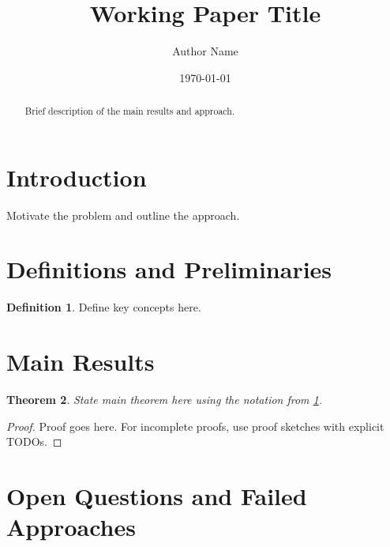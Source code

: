 \documentclass{article}
\title{Working Paper Title}
\author{Author Name}
\date{\today}
\newtheorem{theorem}{Theorem}
\theoremstyle{definition}
\newtheorem{definition}[theorem]{Definition}
\theoremstyle{remark}
\begin{document}
\maketitle

\begin{abstract}
Brief description of the main results and approach.
\end{abstract}

\section{Introduction}

Motivate the problem and outline the approach.


\section{Definitions and Preliminaries}

\begin{definition}
\label{defn:example}
Define key concepts here.
\end{definition}


\section{Main Results}

\begin{theorem}
\label{thm:main-result}
State main theorem here using the notation from \cref{defn:example}.
\end{theorem}

\begin{proof}
Proof goes here. For incomplete proofs, use proof sketches with explicit TODOs.
\end{proof}


\section{Open Questions and Failed Approaches}
\end{document}
